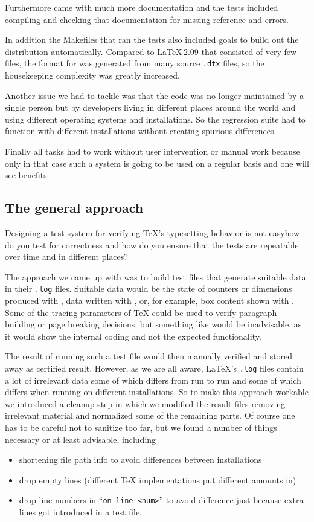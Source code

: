 \documentclass[a4paper]{ltugboat}
\begin{document}
Furthermore \LaTeXe{} came with much more documentation and the
tests included compiling and checking that documentation for missing
reference and errors.

In addition the Makefiles that ran the tests also included goals to
build out the distribution automatically.  Compared to \LaTeX\,2.09
that consisted of very few files, the format for \LaTeXe{} was
generated from many source \texttt{.dtx} files, so the housekeeping
complexity was greatly increased.

Another issue we had to tackle was that the code was no longer
maintained by a single person but by developers living in different
places around the world and using different operating systems and
installations. So the regression suite had to function with different
installations without creating spurious differences.

Finally all tasks had to work without user intervention or manual work because
only in that case such a system is going to be used on a regular basis
and one will see benefits.


\subsection{The general approach}

Designing a test system for verifying \TeX's typesetting behavior is
not easy\Dash how do you test for correctness and how do you ensure
that the tests are repeatable over time and in different places?

The approach we came up with was to build test files that generate
suitable data in their \texttt{.log} files. Suitable data would be
the state of counters or dimensions produced with , data
written with , or, for example, box content shown with
. Some of the tracing parameters of \TeX{} could be used to
verify paragraph building or page breaking decisions, but something
like  would be inadvisable, as it would show the
internal coding and not the expected functionality.

The result of running such a test file would then manually verified
and stored away as certified result. However, as we are all aware,
\LaTeX's \texttt{.log} files contain a lot of irrelevant data some of
which differs from run to run and some of which differs when running
on different installations. So to make this approach workable we
introduced a cleanup step in which we modified the result files
removing irrelevant material and normalized some of the remaining
parts. Of course one has to be careful not to sanitize too far, but we
found a number of things necessary or at least advisable, including
\begin{itemize}
\item  shortening file path info to avoid differences between
installations
\item drop empty lines (different \TeX{} implementations put
different amounts in)
\item drop line numbers in ``\texttt{on line <num>}'' to avoid difference
 just because extra lines got introduced in a test file.
\end{itemize}
\end{document}
